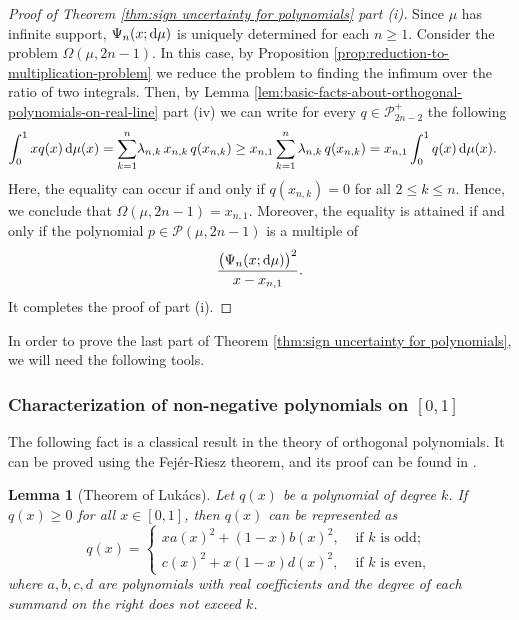 \documentclass[reqno, a4paper]{amsart}
\renewcommand{\d}{\text{\rm d}}
\theoremstyle{plain}
\newtheorem{lemma}[theorem]{Lemma}
\theoremstyle{definition}
\theoremstyle{remarkstyle}
\numberwithin{equation}{section}
\begin{document}
\begin{proof}[Proof of Theorem \ref{thm:sign uncertainty for polynomials} part \textnormal{(i)}]

Since $\mu$ has infinite support, $\Psi_n(x;\d\mu)$ is uniquely determined for each $n\geq 1$. Consider the problem $\Omega(\mu, 2n-1)$.
In this case, by Proposition \ref{prop:reduction-to-multiplication-problem} we reduce the problem to finding the infimum over the ratio of two integrals. Then, by Lemma \ref{lem:basic-facts-about-orthogonal-polynomials-on-real-line} part (iv) we can write for every $q\in \mathcal{P}_{2n-2}^+$ the following
\begin{equation}\label{eq:lower-bound-with-quadrature-formula}
   \begin{split}
        \int_0^1 x q(x)\, \d\mu(x)=\sum_{k=1}^{n} & \lambda_{n, k}\, x_{n, k} \, q(x_{n, k})\geq x_{n, 1}\sum_{k=1}^{n} \lambda_{n, k} \, q(x_{n, k})=x_{n, 1} \int_0^1 q(x)\, \d\mu(x).
   \end{split}
\end{equation}
Here, the equality can occur if and only if $q(x_{n, k})=0$ for all $2\leq k\leq n$. Hence, we conclude that $\Omega(\mu, 2n-1)=x_{n, 1}$. Moreover, the equality is attained if and only if the polynomial $p\in \mathcal{P}(\mu, 2n-1)$ is a multiple of 
\begin{equation*}
    \frac{\bigl(\Psi_n(x; \d\mu)\bigr)^2}{x-x_{n, 1}}.
\end{equation*}
It completes the proof of part (i).
\end{proof}

In order to prove the last part of Theorem \ref{thm:sign uncertainty for polynomials}, we will need the following tools. 
\subsubsection{Characterization of non-negative polynomials on \texorpdfstring{$[0,1]$}{[0,1]}}
The following fact is a classical result in the theory of orthogonal polynomials. It can be proved using the Fej\'{e}r-Riesz theorem, and its proof can be found in \cite[$\mathsection 1.21$]{SzegoOrthogonalPolynomials1939}.

\begin{lemma}[Theorem of Luk\'{a}cs]\label{lem:lukacs-theorem}
    Let $q(x)$ be a polynomial of degree $k$. If $q(x)\geq 0$ for all $x\in [0, 1]$, then $q(x)$ can be represented as
    \begin{equation*}
        q(x)=\begin{cases}
            x a(x)^2+(1-x) b(x)^2, &\text{ if $k$ is odd};\\
            c(x)^2+x(1-x) d(x)^2, &\text{ if $k$ is even},
        \end{cases}
    \end{equation*}
    where $a, b, c, d$ are polynomials with real coefficients and the degree of each summand on the right does not exceed $k$.
\end{lemma}
\end{document}
